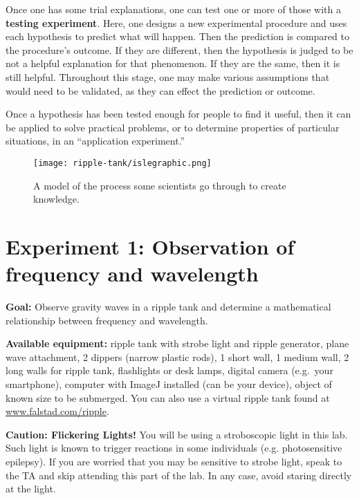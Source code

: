 Once one has some trial explanations, one can test one or more of those with a \textbf{testing experiment}. Here, one designs a new experimental procedure and uses each hypothesis to predict what will happen. Then the prediction is compared to the procedure's outcome. If they are different, then the hypothesis is judged to be not a helpful explanation for that phenomenon. If they are the same, then it is still helpful. Throughout this stage, one may make various assumptions that would need to be validated, as they can effect the prediction or outcome.

Once a hypothesis has been tested enough for people to find it useful, then it can be applied to solve practical problems, or to determine properties of particular situations, in an ``application experiment.''

\begin{figure}
	\centering
	\texttt{[image: ripple-tank/islegraphic.png]}
	\caption{A model of the process some scientists go through to create knowledge.\cite{etkina_millikan_2015}}\label{me:fig:isle}
\end{figure}

\section{Experiment 1: Observation of frequency and wavelength}

\textbf{Goal:} Observe gravity waves in a ripple tank and determine a mathematical relationship between frequency and wavelength.

\textbf{Available equipment:} ripple tank with strobe light and ripple generator, plane wave attachment, 2 dippers (narrow plastic rods), 1 short wall, 1 medium wall, 2 long walls for ripple tank, flashlights or desk lamps, digital camera (e.g.\ your smartphone), computer with ImageJ installed (can be your device), object of known size to be submerged. You can also use a virtual ripple tank found at \url{www.falstad.com/ripple}.

\begin{framed}
	\textbf{Caution: Flickering Lights!} You will be using a stroboscopic light in this lab. Such light is known to trigger reactions in some individuals (e.g. photosensitive epilepsy).
	If you are worried that you may be sensitive to strobe light, speak to the TA and skip attending this part of the lab.
	In any case, avoid staring directly at the light.
\end{framed}

